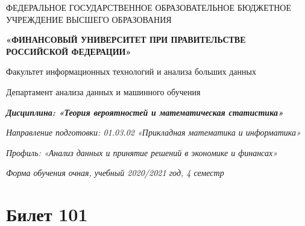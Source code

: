 \documentclass[a4paper,12pt]{article}
\begin{document}
\begin{center}
ФЕДЕРАЛЬНОЕ ГОСУДАРСТВЕННОЕ ОБРАЗОВАТЕЛЬНОЕ БЮДЖЕТНОЕ УЧРЕЖДЕНИЕ ВЫСШЕГО ОБРАЗОВАНИЯ

    \textbf{«ФИНАНСОВЫЙ УНИВЕРСИТЕТ ПРИ ПРАВИТЕЛЬСТВЕ РОССИЙСКОЙ ФЕДЕРАЦИИ»}

Факультет информационных технологий и анализа больших данных

Департамент анализа данных и машинного обучения

\textit{
	\textbf{Дисциплина: «Теория вероятностей и математическая статистика»}}

\textit{Направление подготовки: 01.03.02 «Прикладная математика и информатика»}

\textit{Профиль: «Анализ данных и принятие решений в экономике и финансах»}

\textit{Форма обучения очная, учебный 2020/2021 год, 4 семестр}



\end{center}


\section{Билет 101}
\end{document}
